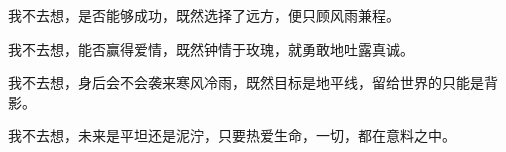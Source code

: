 
\cnabstract


我不去想，是否能够成功，既然选择了远方，便只顾风雨兼程。

我不去想，能否赢得爱情，既然钟情于玫瑰，就勇敢地吐露真诚。

我不去想，身后会不会袭来寒风冷雨，既然目标是地平线，留给世界的只能是背影。

我不去想，未来是平坦还是泥泞，只要热爱生命，一切，都在意料之中。

